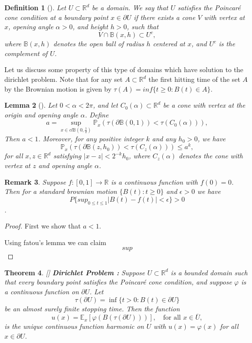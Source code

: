 \documentclass{article}
\numberwithin{equation}{section}
\newtheorem{theorem}{Theorem}[section]
\newtheorem{lemma}[theorem]{Lemma}
\newtheorem{remark}[theorem]{Remark}
\newtheorem{definition}[theorem]{Definition}
\begin{document}
\begin{definition}
[{\cite[Definition 3.10]{PeresMortersBook}}]
Let \( U \subset \mathbb{R}^d \) be a domain. We say that \( U \) satisfies the \emph{Poincaré cone condition} at a boundary point \( x \in \partial U \) if there exists a cone \( V \) with vertex at \( x \), opening angle \( \alpha > 0 \), and height \( h > 0 \), such that
\[
V \cap \mathbb{B}(x, h) \subset U^c,
\]
where \( \mathbb{B}(x, h) \) denotes the open ball of radius \( h \) centered at \( x \), and \( U^c \) is the complement of \( U \).
\end{definition}
\noindent Let us discuss some property of this type of domains which have solution to the dirichlet problem. Note that for any set \(A \subset \mathbb{R}^d\) the first hitting time of the set \(A\) by the Brownian motion is given by \(\tau(A) = inf\{ t \geq 0 : B(t) \in A\}\).
\begin{lemma}[{\cite[Lemma 3.11]{PeresMortersBook}}]
Let \( 0 < \alpha < 2\pi \), and let \( C_0(\alpha) \subset \mathbb{R}^d \) be a cone with vertex at the origin and opening angle \( \alpha \). Define
\[
a = \sup_{x \in cl \mathbb{B}(0, \frac{1}{2})} \mathbb{P}_x\left( \tau(\partial \mathbb{B}(0,1)) < \tau(C_0(\alpha)) \right),
\]
Then \( a < 1 \). Moreover, for any positive integer \( k \) and any \( h_0 > 0 \), we have
\[
\mathbb{P}_x\left( \tau(\partial \mathbb{B}(z, h_0)) < \tau(C_z(\alpha)) \right) \leq a^k,
\]
for all \( x, z \in \mathbb{R}^d \) satisfying \( |x - z| < 2^{-k} h_0 \), where \( C_z(\alpha) \) denotes the cone with vertex at \( z \) and opening angle \( \alpha \).

\end{lemma}
\begin{remark}
Suppose \(f :[0,1] \to \mathbb{R}\) is a continuous function with \(f(0)=0\). Then for a standard brownian motion \(\{B(t) : t \geq 0\}\) and \(\epsilon > 0\) we have 
\[
P\{sup_{0 \leq t \leq 1} |B(t)-f(t)| < \epsilon\} >0
\].
\end{remark}
\begin{proof}
First we show that \(a < 1\).

\noindent Using fatou's lemma we can claim 
\[
sup
\]

\end{proof}
\begin{theorem}\label{Dirichlet-problem}
[{\cite[Theorem 3.12]{PeresMortersBook}}]
\textbf{Dirichlet Problem :} Suppose \( U \subset \mathbb{R}^d \) is a bounded domain such that every boundary point satisfies the Poincaré cone condition, and suppose \( \varphi \) is a continuous function on \( \partial U \). Let 
\[
\tau(\partial U) = \inf\{ t > 0 : B(t) \in \partial U \}
\]
be an almost surely finite stopping time. Then the function
\[
u(x) = \mathbb{E}_x[\varphi(B(\tau(\partial U)))], \quad \text{for all } x \in \overline{U},
\]
is the unique continuous function harmonic on \( U \) with \( u(x) = \varphi(x) \) for all \( x \in \partial U \).

\end{theorem}
\end{document}
